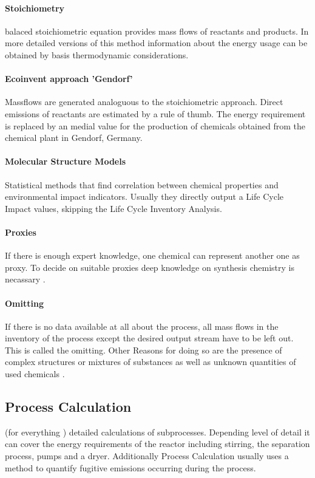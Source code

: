     \paragraph{Stoichiometry}balaced stoichiometric equation provides mass flows of reactants and products. In more detailed versions of this method information about the energy usage can be obtained by basis thermodynamic considerations.
    \paragraph{Ecoinvent approach 'Gendorf'}Massflows are generated analoguous to the stoichiometric approach. Direct emissions of reactants are estimated by a rule of thumb. The energy requirement is replaced by an medial value for the production of chemicals obtained from the chemical plant in Gendorf, Germany. 
    \paragraph{Molecular Structure Models} Statistical methods that find correlation between chemical properties and environmental impact indicators. Usually they directly output a Life Cycle Impact values, skipping the Life Cycle Inventory Analysis\cite{pavatker.2017}.
    \paragraph{Proxies}If there is enough expert knowledge, one chemical can represent another one as proxy. To decide on suitable proxies deep knowledge on synthesis chemistry is necassary \cite{pavatker.2017}.

    \paragraph{Omitting} If there is no data available at all about the process, all mass flows in the inventory of the process except the desired output stream have to be left out. This is called the omitting.  Other Reasons for doing so are the presence of complex structures or mixtures of substances as well as unknown quantities of used chemicals \cite{2019.Pavatker}.
    
\subsection{Process Calculation}
 
 (for everything \cite{pavatker.2017})
detailed calculations of subprocesses. Depending level of detail it can cover the energy requirements of the reactor including stirring, the separation process, pumps and a dryer. Additionally Process Calculation usually uses a method to quantify fugitive emissions occurring during the process.


